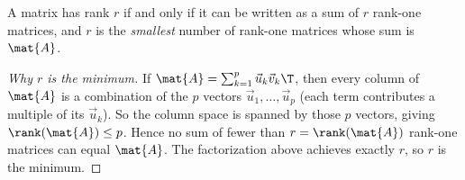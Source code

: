 \begin{theorem}\label{ch16:sum-rank-one}
A matrix has rank $r$ if and only if it can be written as a sum of $r$ rank-one
matrices, and $r$ is the \emph{smallest} number of rank-one matrices whose sum is
$\mat{A}$.
\end{theorem}

\begin{proof}[Why $r$ is the minimum]
If $\mat{A}=\sum_{k=1}^{p}\vec{u}_k\vec{v}_k\T$, then every column of $\mat{A}$ is
a combination of the $p$ vectors $\vec{u}_1,\dots,\vec{u}_p$ (each term
contributes a multiple of its $\vec{u}_k$). So the column space is spanned by
those $p$ vectors, giving $\rank(\mat{A})\le p$. Hence no sum of fewer than
$r=\rank(\mat{A})$ rank-one matrices can equal $\mat{A}$. The factorization above
achieves exactly $r$, so $r$ is the minimum.
\end{proof}

